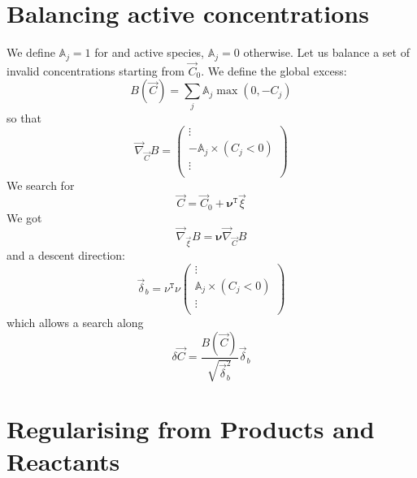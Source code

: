 \documentclass[aps,12pt]{revtex4}
\newcommand{\trn}[1]{{#1}^{\mathtt{T}}}
\begin{document}
\section{Balancing active concentrations}
We define $\mathbb{A}_j=1$ for and active species, $\mathbb{A}_j=0$ otherwise.
Let us balance a set of invalid concentrations starting from $\vec{C}_0$.
We define the global excess:
\begin{equation}
	B\left(\vec{C}\right) = \sum_j \mathbb{A}_j \max(0,-C_j)
\end{equation}
so that
\begin{equation}
	\vec{\nabla}_{\vec{C}} B = 
	\begin{pmatrix}
		\vdots\\
		-\mathbb{A}_j \times (C_j<0) \\
		\vdots\\
	\end{pmatrix}
\end{equation}
We search for
\begin{equation}
	\vec{C} = \vec{C}_0 + \trn{\bm{\nu}} \vec{\xi}
\end{equation}
We got
\begin{equation}
	\vec{\nabla}_{\vec{\xi}} B = \bm{\nu} \vec{\nabla}_{\vec{C}} B
\end{equation}
and a descent direction:
\begin{equation}
	\vec{\delta}_b = \trn{\nu}\nu  
	\begin{pmatrix}
		\vdots\\
		\mathbb{A}_j \times (C_j<0) \\
		\vdots\\
	\end{pmatrix}
\end{equation}
which allows a search along
\begin{equation}
	\delta \vec{C} = %
	\dfrac{B(\vec{C})}
	{\sqrt{\vec{\delta}_b^2}}
	 \vec{\delta}_b
\end{equation}

\section{Regularising from Products and Reactants}
\end{document}
